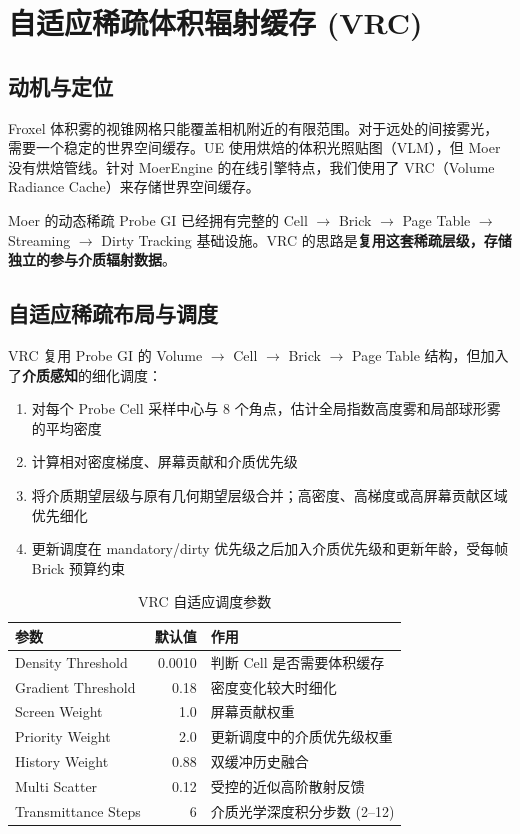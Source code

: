 \documentclass[11pt,a4paper]{article}
\begin{document}
\section{自适应稀疏体积辐射缓存 (VRC)}

\subsection{动机与定位}

Froxel 体积雾的视锥网格只能覆盖相机附近的有限范围。对于远处的间接雾光，需要一个稳定的世界空间缓存。UE 使用烘焙的体积光照贴图（VLM），但 Moer 没有烘焙管线。针对 MoerEngine 的在线引擎特点，我们使用了 VRC（Volume Radiance Cache）来存储世界空间缓存。

Moer 的动态稀疏 Probe GI 已经拥有完整的 Cell $\to$ Brick $\to$ Page Table $\to$ Streaming $\to$ Dirty Tracking 基础设施。VRC 的思路是\textbf{复用这套稀疏层级，存储独立的参与介质辐射数据}。

\subsection{自适应稀疏布局与调度}

VRC 复用 Probe GI 的 Volume $\to$ Cell $\to$ Brick $\to$ Page Table 结构，但加入了\textbf{介质感知}的细化调度：

\begin{enumerate}
    \item 对每个 Probe Cell 采样中心与 8 个角点，估计全局指数高度雾和局部球形雾的平均密度
    \item 计算相对密度梯度、屏幕贡献和介质优先级
    \item 将介质期望层级与原有几何期望层级合并；高密度、高梯度或高屏幕贡献区域优先细化
    \item 更新调度在 mandatory/dirty 优先级之后加入介质优先级和更新年龄，受每帧 Brick 预算约束
\end{enumerate}

\begin{table}[H]
\centering
\begin{tabular}{lrl}
\toprule
参数 & 默认值 & 作用 \\
\midrule
Density Threshold & 0.0010 & 判断 Cell 是否需要体积缓存 \\
Gradient Threshold & 0.18 & 密度变化较大时细化 \\
Screen Weight & 1.0 & 屏幕贡献权重 \\
Priority Weight & 2.0 & 更新调度中的介质优先级权重 \\
History Weight & 0.88 & 双缓冲历史融合 \\
Multi Scatter & 0.12 & 受控的近似高阶散射反馈 \\
Transmittance Steps & 6 & 介质光学深度积分步数 (2--12) \\
\bottomrule
\end{tabular}
\caption{VRC 自适应调度参数}
\end{table}
\end{document}
